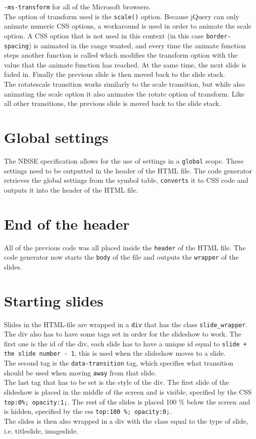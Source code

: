 \texttt{-ms-transform} for all of the Microsoft browsers. \\
The option of transform used is the \texttt{scale()} option. Because jQuery can only animate numeric CSS options, a workaround is used in order to animate the scale option. A CSS option that is not used in this context (in this case \texttt{border-spacing}) is animated in the range wanted, and every time the animate function steps another function is called which modifies the transform option with the value that the animate function has reached. At the same time, the next slide is faded in. Finally the previous slide is then moved back to the slide stack. \\
The rotatescale transition works similarly to the scale transition, but while also animating the scale option it also animates the rotate option of transform. Like all other transitions, the previous slide is moved back to the slide stack.

\section{Global settings}
The NISSE specification allows for the use of settings in a \texttt{global} scope. These settings need to be outputted in the header of the HTML file. The code generator retrieves the global settings from the symbol table, \texttt{converts} it to CSS code and outputs it into the header of the HTML file.

\section{End of the header}
All of the previous code was all placed inside the \texttt{header} of the HTML file. The code generator now starts the \texttt{body} of the file and outputs the \texttt{wrapper} of the slides.

\section{Starting slides}
Slides in the HTML-file are wrapped in a \texttt{div} that has the class \texttt{slide\_wrapper}. The div also has to have some tags set in order for the slideshow to work. The first one is the id of the div, each slide has to have a unique id equal to \texttt{slide + the slide number - 1}, this is used when the slideshow moves to a slide. \\
The second tag is the \texttt{data-transition} tag, which specifies what transition should be used when moving \texttt{away} from that slide. \\
The last tag that has to be set is the style of the div. The first slide of the slideshow is placed in the middle of the screen and is visible, specified by the CSS \texttt{top:0\%; opacity:1;}. The rest of the slides is placed 100 \% below the screen and is hidden, specified by the css \texttt{top:100 \%; opacity:0;}. \\
The slides is then also wrapped in a div with the class equal to the type of slide, i.e. titleslide, imageslide.

